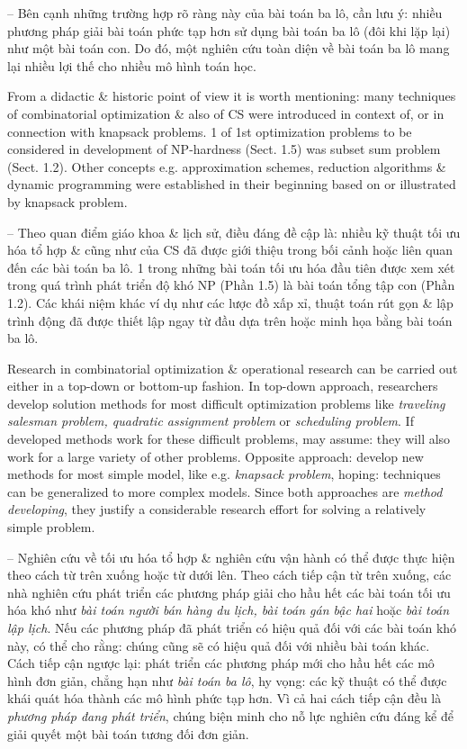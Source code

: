 \documentclass{article}
\begin{document}
\begin{itemize}
\begin{itemize}
        -- Bên cạnh những trường hợp rõ ràng này của bài toán ba lô, cần lưu ý: nhiều phương pháp giải bài toán phức tạp hơn sử dụng bài toán ba lô (đôi khi lặp lại) như một bài toán con. Do đó, một nghiên cứu toàn diện về bài toán ba lô mang lại nhiều lợi thế cho nhiều mô hình toán học.
        
        From a didactic \& historic point of view it is worth mentioning: many techniques of combinatorial optimization \& also of CS were introduced in context of, or in connection with knapsack problems. 1 of 1st optimization problems to be considered in development of NP-hardness (Sect. 1.5) was subset sum problem (Sect. 1.2). Other concepts e.g. approximation schemes, reduction algorithms \& dynamic programming were established in their beginning based on or illustrated by knapsack problem.
        
        -- Theo quan điểm giáo khoa \& lịch sử, điều đáng đề cập là: nhiều kỹ thuật tối ưu hóa tổ hợp \& cũng như của CS đã được giới thiệu trong bối cảnh hoặc liên quan đến các bài toán ba lô. 1 trong những bài toán tối ưu hóa đầu tiên được xem xét trong quá trình phát triển độ khó NP (Phần 1.5) là bài toán tổng tập con (Phần 1.2). Các khái niệm khác ví dụ như các lược đồ xấp xỉ, thuật toán rút gọn \& lập trình động đã được thiết lập ngay từ đầu dựa trên hoặc minh họa bằng bài toán ba lô.
        
        Research in combinatorial optimization \& operational research can be carried out either in a top-down or bottom-up fashion. In top-down approach, researchers develop solution methods for most difficult optimization problems like {\it traveling salesman problem, quadratic assignment problem} or {\it scheduling problem}. If developed methods work for these difficult problems, may assume: they will also work for a large variety of other problems. Opposite approach: develop new methods for most simple model, like e.g. {\it knapsack problem}, hoping: techniques can be generalized to more complex models. Since both approaches are {\it method developing}, they justify a considerable research effort for solving a relatively simple problem.
        
        -- Nghiên cứu về tối ưu hóa tổ hợp \& nghiên cứu vận hành có thể được thực hiện theo cách từ trên xuống hoặc từ dưới lên. Theo cách tiếp cận từ trên xuống, các nhà nghiên cứu phát triển các phương pháp giải cho hầu hết các bài toán tối ưu hóa khó như {\it bài toán người bán hàng du lịch, bài toán gán bậc hai} hoặc {\it bài toán lập lịch}. Nếu các phương pháp đã phát triển có hiệu quả đối với các bài toán khó này, có thể cho rằng: chúng cũng sẽ có hiệu quả đối với nhiều bài toán khác. Cách tiếp cận ngược lại: phát triển các phương pháp mới cho hầu hết các mô hình đơn giản, chẳng hạn như {\it bài toán ba lô}, hy vọng: các kỹ thuật có thể được khái quát hóa thành các mô hình phức tạp hơn. Vì cả hai cách tiếp cận đều là {\it phương pháp đang phát triển}, chúng biện minh cho nỗ lực nghiên cứu đáng kể để giải quyết một bài toán tương đối đơn giản.
        

\end{itemize}
\end{itemize}
\end{document}
